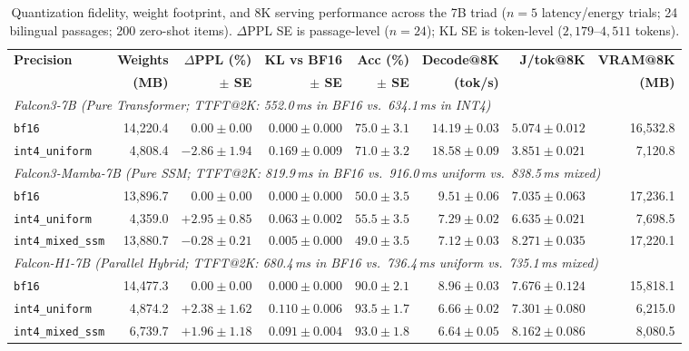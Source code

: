 \documentclass[10pt,a4paper]{article}
\begin{document}
\begin{table}[ht!]
\centering
\footnotesize
\setlength{\tabcolsep}{4.8pt}
\caption{Quantization fidelity, weight footprint, and 8K serving performance across the 7B triad ($n=5$ latency/energy trials; 24 bilingual passages; 200 zero-shot items). $\Delta$PPL SE is passage-level ($n=24$); KL SE is token-level ($2{,}179\text{--}4{,}511$ tokens).}
\label{tab:quant}
\begin{tabular}{lrrrrrrr}
\toprule
\textbf{Precision} & \textbf{Weights} & \textbf{$\Delta$PPL (\%)} & \textbf{KL vs BF16} & \textbf{Acc (\%)} & \textbf{Decode@8K} & \textbf{J/tok@8K} & \textbf{VRAM@8K} \\
& \textbf{(MB)} & \textbf{$\pm$ SE} & \textbf{$\pm$ SE} & \textbf{$\pm$ SE} & \textbf{(tok/s)} & & \textbf{(MB)} \\
\midrule
\multicolumn{8}{l}{\textit{Falcon3-7B (Pure Transformer; TTFT@2K: 552.0\,ms in BF16 vs.\ 634.1\,ms in INT4)}} \\
\texttt{bf16}          & 14,220.4 & $0.00 \pm 0.00$    & $0.000 \pm 0.000$ & $75.0 \pm 3.1$ & $14.19 \pm 0.03$ & $5.074 \pm 0.012$ & 16,532.8 \\
\texttt{int4\_uniform} &  4,808.4 & $-2.86 \pm 1.94$   & $0.169 \pm 0.009$ & $71.0 \pm 3.2$ & $18.58 \pm 0.09$ & $3.851 \pm 0.021$ &  7,120.8 \\
\midrule
\multicolumn{8}{l}{\textit{Falcon3-Mamba-7B (Pure SSM; TTFT@2K: 819.9\,ms in BF16 vs.\ 916.0\,ms uniform vs.\ 838.5\,ms mixed)}} \\
\texttt{bf16}          & 13,896.7 & $0.00 \pm 0.00$    & $0.000 \pm 0.000$ & $50.0 \pm 3.5$ & $9.51 \pm 0.06$  & $7.035 \pm 0.063$ & 17,236.1 \\
\texttt{int4\_uniform} &  4,359.0 & $+2.95 \pm 0.85$   & $0.063 \pm 0.002$ & $55.5 \pm 3.5$ & $7.29 \pm 0.02$  & $6.635 \pm 0.021$ &  7,698.5 \\
\texttt{int4\_mixed\_ssm} & 13,880.7 & $-0.28 \pm 0.21$ & $0.005 \pm 0.000$ & $49.0 \pm 3.5$ & $7.12 \pm 0.03$  & $8.271 \pm 0.035$ & 17,220.1 \\
\midrule
\multicolumn{8}{l}{\textit{Falcon-H1-7B (Parallel Hybrid; TTFT@2K: 680.4\,ms in BF16 vs.\ 736.4\,ms uniform vs.\ 735.1\,ms mixed)}} \\
\texttt{bf16}          & 14,477.3 & $0.00 \pm 0.00$    & $0.000 \pm 0.000$ & $90.0 \pm 2.1$ & $8.96 \pm 0.03$  & $7.676 \pm 0.124$ & 15,818.1 \\
\texttt{int4\_uniform} &  4,874.2 & $+2.38 \pm 1.62$   & $0.110 \pm 0.006$ & $93.5 \pm 1.7$ & $6.66 \pm 0.02$  & $7.301 \pm 0.080$ &  6,215.0 \\
\texttt{int4\_mixed\_ssm} &  6,739.7 & $+1.96 \pm 1.18$ & $0.091 \pm 0.004$ & $93.0 \pm 1.8$ & $6.64 \pm 0.05$  & $8.162 \pm 0.086$ &  8,080.5 \\
\bottomrule
\end{tabular}
\end{table}
\end{document}
